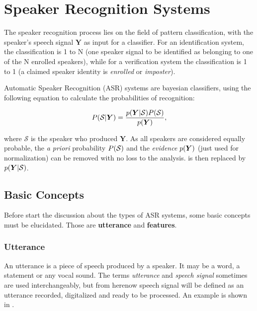\chapter{Speaker Recognition Systems}
\label{ch:speaker-recognition-systems}


The speaker recognition process lies on the field of pattern classification, with the speaker's speech signal $\boldsymbol{Y}$ as input for a classifier. For an identification system, the classification is 1 to N (one speaker signal to be identified as belonging to one of the N enrolled speakers), while for a verification system the classification is 1 to 1 (a claimed speaker identity is \emph{enrolled} or \emph{imposter}).

Automatic Speaker Recognition (ASR) systems are bayesian classifiers, using the following equation to calculate the probabilities of recognition:

\begin{equation}
    \postprob{\mathcal{S}}{\boldsymbol{Y}} = \frac{\postpdf{\boldsymbol{Y}}{\mathcal{S}} \prob{\mathcal{S}}}{\pdf{\boldsymbol{Y}}},
    \label{eq:bayes_equation}
\end{equation}

\noindent where $\mathcal{S}$ is the speaker who produced $\boldsymbol{Y}$. As all speakers are considered equally probable, the \emph{a priori} probability $P(\mathcal{S})$ and the \emph{evidence} $p(\boldsymbol{Y})$ (just used for normalization) can be removed with no loss to the analysis.  is then replaced by $p(\boldsymbol{Y}|\mathcal{S})$.

\section{Basic Concepts}
\label{sec:basic-concepts}

Before start the discussion about the types of ASR systems, some basic concepts must be elucidated. Those are \textbf{utterance} and \textbf{features}.

\subsection{Utterance}

An utterance is a piece of speech produced by a speaker. It may be a word, a statement or any vocal sound. The terms \emph{utterance} and \emph{speech signal} sometimes are used interchangeably, but from herenow speech signal will be defined as an utterance recorded, digitalized and ready to be processed. An example is shown in .


